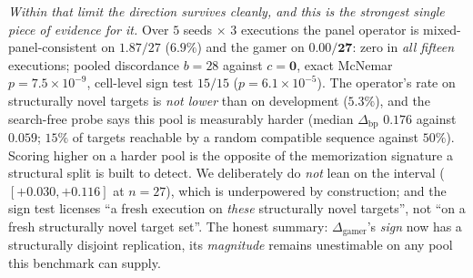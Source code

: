 \documentclass[11pt]{article}
\begin{document}
\emph{Within that limit the direction survives cleanly, and this is the strongest single piece of evidence for
it.} Over $5$ seeds $\times$ $3$ executions the panel operator is mixed-panel-consistent on $1.87/27$
($6.9\%$) and the gamer on $\mathbf{0.00/27}$: zero in \emph{all fifteen} executions; pooled discordance
$b{=}28$ against $c{=}\mathbf{0}$, exact McNemar $p{=}7.5\!\times\!10^{-9}$, cell-level sign test $15/15$
($p{=}6.1\!\times\!10^{-5}$). The operator's rate on structurally novel targets is \emph{not lower} than on
development ($5.3\%$), and the search-free probe says this pool is measurably harder (median
$\Delta_{\mathrm{bp}}$ $0.176$ against $0.059$; $15\%$ of targets reachable by a random compatible sequence
against $50\%$). Scoring higher on a harder pool is the opposite of the memorization signature a structural
split is built to detect. We deliberately do \emph{not} lean on the interval ($[{+}0.030,{+}0.116]$ at
$n{=}27$), which is underpowered by construction; and the sign test licenses ``a fresh execution on
\emph{these} structurally novel targets'', not ``on a fresh structurally novel target set''. The honest
summary: $\Delta_{\mathrm{gamer}}$'s \emph{sign} now has a structurally disjoint replication, its
\emph{magnitude} remains unestimable on any pool this benchmark can supply.
\end{document}
